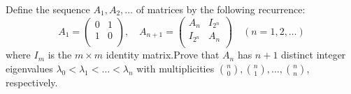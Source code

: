 \documentclass{article}
\begin{document}
\setlength{\parindent}{0pt}
Define the sequence $A_1,A_2,\ldots$ of matrices by the following recurrence:$$A_1 = \begin{pmatrix} 0 &1 \\ 1 & 0 \\ \end{pmatrix},
\quad
A_{n+1} = \begin{pmatrix} A_n &I_{2^n} \\ I_{2^n} &A_n \\ \end{pmatrix}
\quad (n=1,2,\ldots)
$$where $I_m$ is the $m\times m$ identity matrix.\newline Prove that $A_n$ has $n+1$ distinct integer eigenvalues $\lambda_0<\lambda_1<\ldots<\lambda_n$ with multiplicities $\binom{n}{0},\binom{n}{1},\ldots,\binom{n}{n}$, respectively.
\end{document}
